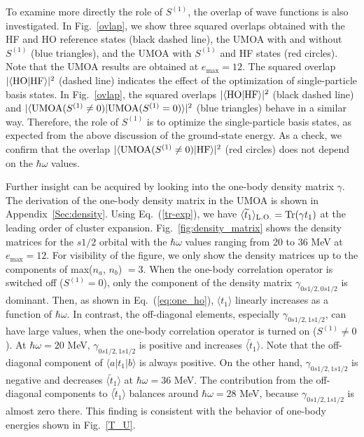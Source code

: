 \documentclass[aps,prc, dvips, twocolumn,groupedaddress,showkeys,showpacs,floatfix,superscriptaddress]{revtex4-1}
\newcommand{\<}{\langle}
\renewcommand{\>}{\rangle}
\begin{document}
To examine more directly the role of $S^{(1)}$,
 the overlap of wave functions is also investigated.
In Fig.~\ref{ovlap}, we show three squared overlaps
obtained with the HF and HO reference states (black dashed line),
the UMOA with and without $S^{(1)}$ (blue triangles),
 and the UMOA with $S^{(1)}$ and HF states (red circles).
Note that the UMOA results are obtained at $e_{\max} = 12$.
The squared overlap $|\<{\rm HO}|{\rm HF}\>|^{2}$ (dashed line) indicates the effect of the optimization of
 single-particle basis states.
In Fig.~\ref{ovlap}, the squared overlaps $|\<{\rm HO}|{\rm HF}\>|^{2}$ (black dashed line) and
$|\< {\rm UMOA} (S^{(1)} \neq 0)|{\rm UMOA} (S^{(1)} = 0) \>|^{2}$
(blue triangles) behave in a similar way.
Therefore, the role of $S^{(1)}$ is to optimize the single-particle basis states,
 as expected from the above discussion of the ground-state energy.
As a check, we confirm that the overlap $|\< {\rm UMOA}(S^{(1)} \neq 0)|{\rm HF}\>|^{2}$ (red circles)
 does not depend on the $\hbar\omega$ values.

Further insight can be acquired by looking into the one-body density matrix $\gamma$.
The derivation of the one-body density matrix in the UMOA is shown in Appendix~\ref{Sec:density}.
Using Eq.~(\ref{tr-exp}), we have $\<\widetilde{t}_{1}\>_{\rm L.O.} = {\rm Tr}(\gamma t_{1})$ at the leading order of cluster expansion.
Fig.~\ref{fig:density_matrix} shows the density matrices for the $s1/2$ orbital with the $\hbar\omega$ values
ranging from 20 to 36 MeV at $e_{\max} = 12$.
For visibility of the figure, we only show the density matrices up to the components of max($n_a$, $n_b$) $= 3$.
When the one-body correlation operator is switched off ($S^{(1)} = 0$), only the component of the density matrix $\gamma_{0s1/2,0s1/2}$ is dominant.
Then, as shown in Eq.~(\ref{eq:one_ho}),
$\<t_{1}\>$ linearly increases as a function of $\hbar\omega$.
In contrast, the off-diagonal elements, especially $\gamma_{0s1/2,1s1/2}$,
 can have large values, when the one-body correlation operator is turned on ($S^{(1)} \neq 0$).
At $\hbar\omega=20$ MeV, $\gamma_{0s1/2, 1s1/2}$ is positive and increases $\<\widetilde{t}_{1}\>$.
Note that the off-diagonal component of $\<a|t_{1}|b\>$ is always positive.
On the other hand, $\gamma_{0s1/2, 1s1/2}$ is negative and decreases $\<\widetilde{t}_{1}\>$ at
 $\hbar\omega=36$ MeV.
 The contribution from the off-diagonal components to $\<\widetilde{t}_{1}\>$ balances around $\hbar\omega=28$ MeV,
  because $\gamma_{0s1/2,1s1/2}$ is almost zero there.
This finding is consistent with the behavior of one-body energies shown in Fig.~\ref{T_U}.
\end{document}
